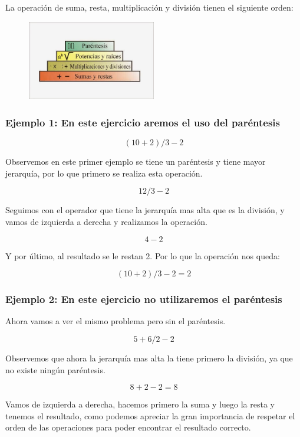 \documentclass[11pt]{book}
\begin{document}
La operación de suma, resta, multiplicación y división tienen el siguiente orden:
\begin{figure}[H]
  \centering
  \includegraphics[width=0.5\textwidth]{./Unidad 2/Images/jerarquia.jpg}
\end{figure}

\subsubsection{Ejemplo 1: En este ejercicio aremos el uso del paréntesis}

\[( 10 + 2 ) / 3 - 2\]

Observemos en este primer ejemplo se tiene un paréntesis y tiene mayor jerarquía, por lo que primero se realiza
esta operación.

\[12 / 3 - 2\]

Seguimos con el operador que tiene la jerarquía mas alta que es la división, y vamos de izquierda a derecha y
realizamos la operación.

\[4 - 2\]

Y por último, al resultado se le restan 2. Por lo que la operación nos queda:

\[( 10 + 2 ) / 3 - 2 = 2\]



\subsubsection{Ejemplo 2: En este ejercicio no utilizaremos el paréntesis}


Ahora vamos a ver el mismo problema pero sin el paréntesis.

\[5 + 6 / 2 - 2\]

Observemos que ahora la jerarquía mas alta la tiene primero la división, ya que no existe ningún paréntesis.

\[8 + 2 - 2 = 8\]

Vamos de izquierda a derecha, hacemos primero la suma y luego la resta y tenemos el resultado, como podemos apreciar
la gran importancia de respetar el orden de las operaciones para poder encontrar el resultado correcto.
\end{document}
